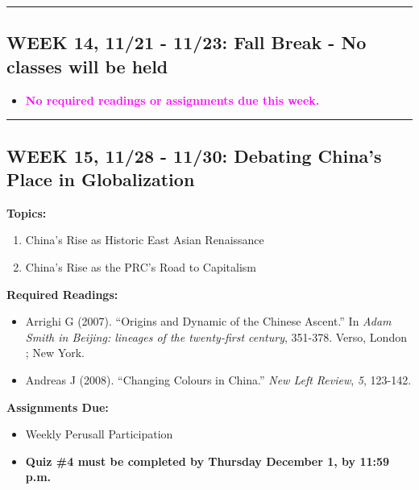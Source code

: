 \documentclass[11pt,]{article}
\providecommand{\tightlist}{%
  \setlength{\itemsep}{0pt}\setlength{\parskip}{0pt}}
\begin{document}
\bigbreak
\hrule

\hypertarget{week-14-1121---1123-fall-break---no-classes-will-be-held}{%
\subsection{WEEK 14, 11/21 - 11/23: Fall Break - No classes will be
held}\label{week-14-1121---1123-fall-break---no-classes-will-be-held}}

\begin{itemize}
\tightlist
\item
  \textcolor{Magenta}{\bf{No required readings or assignments due this week.}}
\end{itemize}

\bigbreak
\hrule

\hypertarget{week-15-1128---1130-debating-chinas-place-in-globalization}{%
\subsection{WEEK 15, 11/28 - 11/30: Debating China's Place in
Globalization}\label{week-15-1128---1130-debating-chinas-place-in-globalization}}

\textbf{Topics:}

\begin{enumerate}
\def\labelenumi{(\arabic{enumi})}
\tightlist
\item
  China's Rise as Historic East Asian Renaissance
\item
  China's Rise as the PRC's Road to Capitalism
\end{enumerate}

\textbf{Required Readings:}

\begin{itemize}
\item
  Arrighi G (2007). ``Origins and Dynamic of the Chinese Ascent.'' In
  \emph{Adam Smith in Beijing: lineages of the twenty-first century},
  351-378. Verso, London ; New York.
\item
  Andreas J (2008). ``Changing Colours in China.'' \emph{New Left
  Review}, \emph{5}, 123-142.
\end{itemize}

\textbf{Assignments Due:}

\begin{itemize}
\tightlist
\item
  Weekly Perusall Participation
\item
  \textbf{Quiz \#4 must be completed by Thursday December 1, by 11:59
  p.m.}
\end{itemize}
\end{document}
